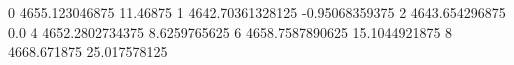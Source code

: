 0 4655.123046875 11.46875
1 4642.70361328125 -0.95068359375
2 4643.654296875 0.0
4 4652.2802734375 8.6259765625
6 4658.7587890625 15.1044921875
8 4668.671875 25.017578125
